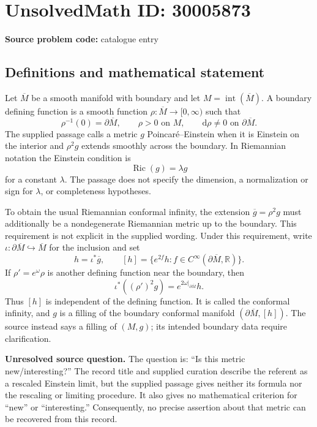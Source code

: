 \documentclass[11pt]{article}
\newcommand{\R}{\mathbb{R}}
\begin{document}
\section*{UnsolvedMath ID: 30005873}
\textbf{Source problem code:} catalogue entry
\subsection{Definitions and mathematical statement}
Let \(\overline M\) be a smooth manifold with boundary and let \(M=\operatorname{int}(\overline M)\). A boundary defining function is a smooth function \(\rho:\overline M\to[0,\infty)\) such that
\[
\rho^{-1}(0)=\partial\overline M,\qquad \rho>0\text{ on }M,\qquad \mathrm d\rho\ne0\text{ on }\partial\overline M.
\]
The supplied passage calls a metric \(g\) Poincar\'e--Einstein when it is Einstein on the interior and \(\rho^2g\) extends smoothly across the boundary. In Riemannian notation the Einstein condition is
\[
\operatorname{Ric}(g)=\lambda g
\]
for a constant \(\lambda\). The passage does not specify the dimension, a normalization or sign for \(\lambda\), or completeness hypotheses.

To obtain the usual Riemannian conformal infinity, the extension \(\overline g=\rho^2g\) must additionally be a nondegenerate Riemannian metric up to the boundary. This requirement is not explicit in the supplied wording. Under this requirement, write \(\iota:\partial\overline M\hookrightarrow\overline M\) for the inclusion and set
\[
h=\iota^*\overline g,\qquad
[h]=\{e^{2f}h:f\in C^\infty(\partial\overline M,\R)\}.
\]
If \(\rho'=e^\omega\rho\) is another defining function near the boundary, then
\[
\iota^*((\rho')^2g)=e^{2\omega|_{\partial\overline M}}h.
\]
Thus \([h]\) is independent of the defining function. It is called the conformal infinity, and \(g\) is a filling of the boundary conformal manifold \((\partial\overline M,[h])\). The source instead says a filling of \((M,g)\); its intended boundary data require clarification.

\textbf{Unresolved source question.} The question is: ``Is this metric new/interesting?'' The record title and supplied curation describe the referent as a rescaled Einstein limit, but the supplied passage gives neither its formula nor the rescaling or limiting procedure. It also gives no mathematical criterion for ``new'' or ``interesting.'' Consequently, no precise assertion about that metric can be recovered from this record.
\end{document}
